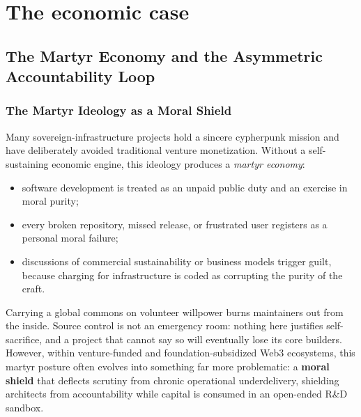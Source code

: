 \documentclass[a4paper,11pt,twoside,parskip=half-,headings=small]{scrartcl}
\begin{document}
\section{The economic case}
\label{sec:econ}

\subsection{The Martyr Economy and the Asymmetric Accountability Loop}
\label{sec:martyr_economy_asymmetric}

\subsubsection{The Martyr Ideology as a Moral Shield}
Many sovereign-infrastructure projects hold a sincere cypherpunk mission and have
deliberately avoided traditional venture monetization. Without a self-sustaining economic
engine, this ideology produces a \emph{martyr economy}:
\begin{itemize}
  \item software development is treated as an unpaid public duty and an exercise in moral purity;
  \item every broken repository, missed release, or frustrated user registers as a personal moral failure;
  \item discussions of commercial sustainability or business models trigger guilt, because charging for infrastructure is coded as corrupting the purity of the craft.
\end{itemize}
Carrying a global commons on volunteer willpower burns maintainers out from the inside. Source control is not an emergency room: nothing here justifies self-sacrifice, and a project that cannot say so will eventually lose its core builders. However, within venture-funded and foundation-subsidized Web3 ecosystems, this martyr posture often evolves into something far more problematic: a \textbf{moral shield} that deflects scrutiny from chronic operational underdelivery, shielding architects from accountability while capital is consumed in an open-ended R\&D sandbox.
\end{document}
